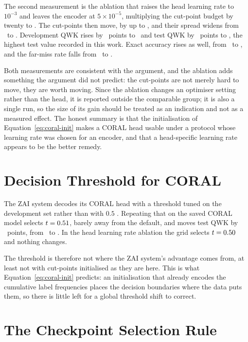 

The second measurement is the ablation that raises the head learning rate to $10^{-3}$ and
leaves the encoder at $5\times10^{-5}$, multiplying the cut-point budget by twenty to
\lrSumHeadlr. The cut-points then move, by up to \cutMoveCoralHeadlr, and their spread widens
from \cutSpreadCoral\ to \cutSpreadCoralHeadlr. Development QWK rises by
\coralHeadlrDevGain\ points to \devQwkCoralHeadlr\ and test QWK by \coralHeadlrTestGain\ points
to \testQwkCoralHeadlr, the highest test value recorded in this work. Exact accuracy rises as
well, from \devAccCoral\ to \devAccCoralHeadlr, and the far-miss rate falls from
\devFarThreeCoral\ to \devFarThreeCoralHeadlr.

Both measurements are consistent with the argument, and the ablation adds something the
argument did not predict: the cut-points are not merely hard to move, they are worth moving.
Since the ablation changes an optimiser setting rather than the head, it is reported outside the
comparable group; it is also a single run, so the size of its gain should be treated as an
indication and not as a measured effect. The honest summary is that the initialisation of
Equation~\ref{eq:coral-init} makes a CORAL head usable under a protocol whose learning rate was
chosen for an encoder, and that a head-specific learning rate appears to be the better remedy.

\section{Decision Threshold for CORAL}
\label{sec:res-threshold}

The ZAI system decodes its CORAL head with a threshold tuned on the development set rather than
with $0.5$ \cite{nazzal2025zai}. Repeating that on the saved CORAL model selects
$t=0.51$, barely away from the default, and moves test QWK by \zaiTestGainCoral\ points,
from \testQwkCoral\ to \zaiTestQwkCoral. In the head learning rate ablation the grid selects
$t=0.50$ and nothing changes.

The threshold is therefore not where the ZAI system's advantage comes from, at least not with
cut-points initialised as they are here. This is what Equation~\ref{eq:coral-init} predicts: an
initialisation that already encodes the cumulative label frequencies places the decision
boundaries where the data puts them, so there is little left for a global threshold shift to
correct.

\section{The Checkpoint Selection Rule}
\label{sec:res-selection}

